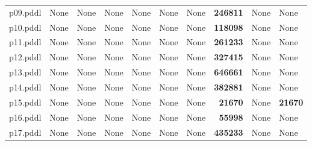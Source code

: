 \documentclass{article}
\begin{document}
\begin{tabular}{@{}lrrrrrrrrr@{}}
p09.pddl & \multicolumn{1}{|l|}{None} & \multicolumn{1}{|l|}{None} & \multicolumn{1}{|l|}{None} & \multicolumn{1}{|l|}{None} & \multicolumn{1}{|l|}{None} & \multicolumn{1}{|l|}{None} & \textbf{246811} & \multicolumn{1}{|l|}{None} & \multicolumn{1}{|l|}{None} \\
p10.pddl & \multicolumn{1}{|l|}{None} & \multicolumn{1}{|l|}{None} & \multicolumn{1}{|l|}{None} & \multicolumn{1}{|l|}{None} & \multicolumn{1}{|l|}{None} & \multicolumn{1}{|l|}{None} & \textbf{118098} & \multicolumn{1}{|l|}{None} & \multicolumn{1}{|l|}{None} \\
p11.pddl & \multicolumn{1}{|l|}{None} & \multicolumn{1}{|l|}{None} & \multicolumn{1}{|l|}{None} & \multicolumn{1}{|l|}{None} & \multicolumn{1}{|l|}{None} & \multicolumn{1}{|l|}{None} & \textbf{261233} & \multicolumn{1}{|l|}{None} & \multicolumn{1}{|l|}{None} \\
p12.pddl & \multicolumn{1}{|l|}{None} & \multicolumn{1}{|l|}{None} & \multicolumn{1}{|l|}{None} & \multicolumn{1}{|l|}{None} & \multicolumn{1}{|l|}{None} & \multicolumn{1}{|l|}{None} & \textbf{327415} & \multicolumn{1}{|l|}{None} & \multicolumn{1}{|l|}{None} \\
p13.pddl & \multicolumn{1}{|l|}{None} & \multicolumn{1}{|l|}{None} & \multicolumn{1}{|l|}{None} & \multicolumn{1}{|l|}{None} & \multicolumn{1}{|l|}{None} & \multicolumn{1}{|l|}{None} & \textbf{646661} & \multicolumn{1}{|l|}{None} & \multicolumn{1}{|l|}{None} \\
p14.pddl & \multicolumn{1}{|l|}{None} & \multicolumn{1}{|l|}{None} & \multicolumn{1}{|l|}{None} & \multicolumn{1}{|l|}{None} & \multicolumn{1}{|l|}{None} & \multicolumn{1}{|l|}{None} & \textbf{382881} & \multicolumn{1}{|l|}{None} & \multicolumn{1}{|l|}{None} \\
p15.pddl & \multicolumn{1}{|l|}{None} & \multicolumn{1}{|l|}{None} & \multicolumn{1}{|l|}{None} & \multicolumn{1}{|l|}{None} & \multicolumn{1}{|l|}{None} & \multicolumn{1}{|l|}{None} & \textbf{21670} & \multicolumn{1}{|l|}{None} & \textbf{21670} \\
p16.pddl & \multicolumn{1}{|l|}{None} & \multicolumn{1}{|l|}{None} & \multicolumn{1}{|l|}{None} & \multicolumn{1}{|l|}{None} & \multicolumn{1}{|l|}{None} & \multicolumn{1}{|l|}{None} & \textbf{55998} & \multicolumn{1}{|l|}{None} & \multicolumn{1}{|l|}{None} \\
p17.pddl & \multicolumn{1}{|l|}{None} & \multicolumn{1}{|l|}{None} & \multicolumn{1}{|l|}{None} & \multicolumn{1}{|l|}{None} & \multicolumn{1}{|l|}{None} & \multicolumn{1}{|l|}{None} & \textbf{435233} & \multicolumn{1}{|l|}{None} & \multicolumn{1}{|l|}{None} \\

\end{tabular}
\end{document}
